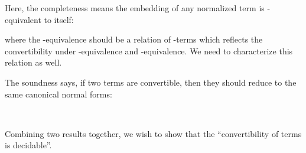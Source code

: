 Here, the completeness means the embedding of any normalized term is \beta\eta-equivalent to itself:

\begin{code}%
\>[0]\AgdaSpace{}%
\AgdaSymbol{:}\AgdaSpace{}%
\AgdaSymbol{(}\AgdaSpace{}%
\AgdaSymbol{:}\AgdaSpace{}%
\AgdaSpace{}%
\AgdaSpace{}%
\AgdaSymbol{)}\AgdaSpace{}%
\AgdaSpace{}%
\AgdaSpace{}%
\AgdaSymbol{(}\AgdaSpace{}%
\AgdaSymbol{)}\AgdaSpace{}%
\AgdaSpace{}%
\<%
\end{code}

where the \beta\eta-equivalence should be a relation of \lambda-terms which reflects the convertibility under \beta-equivalence and \eta-equivalence. We need to characterize this relation as well.

The soundness says, if two terms are convertible, then they should reduce to the same canonical normal forms:

\begin{code}%
\>[0]\AgdaSpace{}%
\AgdaSymbol{:}\AgdaSpace{}%
\AgdaSymbol{(}\AgdaSpace{}%
\AgdaSpace{}%
\AgdaSymbol{:}\AgdaSpace{}%
\AgdaSpace{}%
\AgdaSpace{}%
\AgdaSymbol{)}\AgdaSpace{}%
\AgdaSpace{}%
\AgdaSpace{}%
\AgdaSpace{}%
\AgdaSpace{}%
\AgdaSpace{}%
\AgdaSpace{}%
\AgdaSpace{}%
\AgdaSpace{}%
\AgdaSpace{}%
\<%
\end{code}

\begin{code}[hide]%
\>[0]\AgdaSpace{}%
\AgdaSymbol{=}\AgdaSpace{}%
\AgdaHole{\{!\ \ \ !\}}\<%
\\
\>[0]\AgdaSpace{}%
\AgdaSymbol{=}\AgdaSpace{}%
\AgdaHole{\{!\ \ \ !\}}\<%
\end{code}

Combining two results together, we wish to show that the ``convertibility of terms is decidable''.